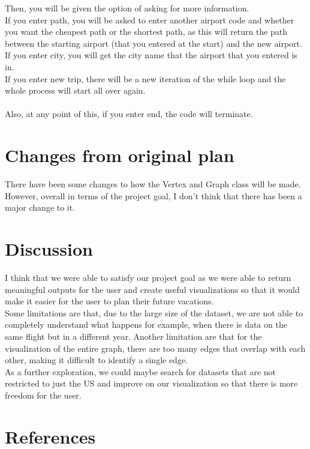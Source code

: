 \documentclass[fontsize=11pt]{article}
\begin{document}
Then, you will be given the option of asking for more information.\\
If you enter path, you will be asked to enter another airport code and whether you want the cheapest path or the shortest path, as this will return the path between the starting airport (that you entered at the start) and the new airport.\\
If you enter city, you will get the city name that the airport that you entered is in.\\
If you enter new trip, there will be a new iteration of the while loop and the whole process will start all over again.\\
\\
Also, at any point of this, if you enter end, the code will terminate.\\

\section*{Changes from original plan}

There have been some changes to how the Vertex and Graph class will be made. However, overall in terms of the project goal, I don't think that there has been a major change to it.

\section*{Discussion}

I think that we were able to satisfy our project goal as we were able to return meaningful outputs for the user and create useful visualizations so that it would make it easier for the user to plan their future vacations. \\
Some limitations are that, due to the large size of the dataset, we are not able to completely understand what happens for example, when there is data on the same flight but in a different year. Another limitation are that for the visualization of the entire graph, there are too many edges that overlap with each other, making it difficult to identify a single edge.\\
As a further exploration, we could maybe search for datasets that are not restricted to just the US and improve on our visualization so that there is more freedom for the user.

\section*{References}
\end{document}
